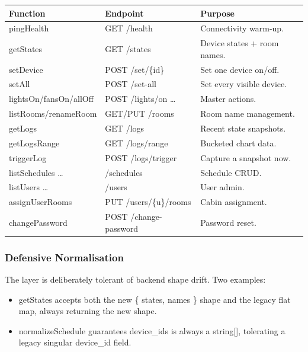\documentclass[11pt,a4paper]{article}
\newcommand{\code}[1]{\colorbox{codebg}{\ttfamily\small #1}}
\begin{document}
\begin{longtable}{@{}p{}p{}p{}@{}}
  \toprule
  \textbf{Function} & \textbf{Endpoint} & \textbf{Purpose} \\
  \midrule
  \endhead
  \code{pingHealth}      & \code{GET /health}        & Connectivity warm-up. \\
  \code{getStates}       & \code{GET /states}        & Device states + room names. \\
  \code{setDevice}       & \code{POST /set/\{id\}}   & Set one device on/off. \\
  \code{setAll}          & \code{POST /set-all}      & Set every visible device. \\
  \code{lightsOn/fansOn/allOff} & \code{POST /lights/on \ldots} & Master actions. \\
  \code{listRooms/renameRoom} & \code{GET/PUT /rooms} & Room name management. \\
  \code{getLogs}         & \code{GET /logs}          & Recent state snapshots. \\
  \code{getLogsRange}    & \code{GET /logs/range}    & Bucketed chart data. \\
  \code{triggerLog}      & \code{POST /logs/trigger} & Capture a snapshot now. \\
  \code{listSchedules \ldots} & \code{/schedules}    & Schedule CRUD. \\
  \code{listUsers \ldots} & \code{/users}            & User admin. \\
  \code{assignUserRooms} & \code{PUT /users/\{u\}/rooms} & Cabin assignment. \\
  \code{changePassword}  & \code{POST /change-password} & Password reset. \\
  \bottomrule
\end{longtable}

\subsubsection{Defensive Normalisation}

The layer is deliberately tolerant of backend shape drift. Two examples:

\begin{itemize}[leftmargin=1.4em]
  \item \code{getStates} accepts both the new \code{\{ states, names \}} shape
        and the legacy flat map, always returning the new shape.
  \item \code{normalizeSchedule} guarantees \code{device\_ids} is always a
        \code{string[]}, tolerating a legacy singular \code{device\_id} field.
\end{itemize}
\end{document}
